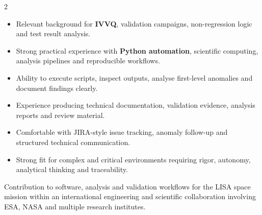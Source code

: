 \documentclass[8pt,a4paper,ragged2e,withhyper]{../_shared/altacv}
\begin{document}
\begin{paracol}{2}

\begin{itemize}
  \item Relevant background for \textbf{IVVQ}, validation campaigns, non-regression logic and test result analysis.
  \item Strong practical experience with \textbf{Python automation}, scientific computing, analysis pipelines and reproducible workflows.
  \item Ability to execute scripts, inspect outputs, analyse first-level anomalies and document findings clearly.
  \item Experience producing technical documentation, validation evidence, analysis reports and review material.
  \item Comfortable with JIRA-style issue tracking, anomaly follow-up and structured technical communication.
  \item Strong fit for complex and critical environments requiring rigor, autonomy, analytical thinking and traceability.
\end{itemize}


\divider
{}
\divider

\medskip



\divider


\divider


\divider


\end{paracol}



Contribution to software, analysis and validation workflows for the LISA space mission within an international engineering and scientific collaboration involving ESA, NASA and multiple research institutes.
\end{document}
